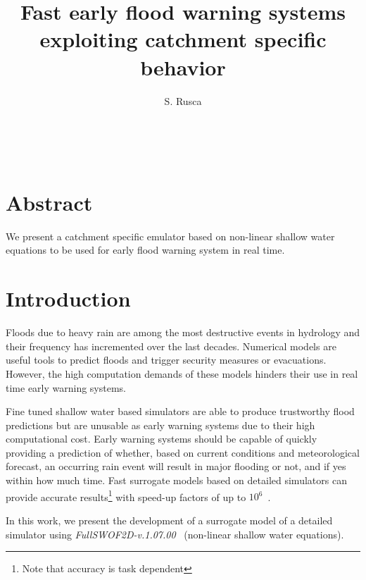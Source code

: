 \documentclass[12pt,a4paper,english,twocolumn,fleqn]{narms}
\begin{document}
\title{Fast early flood warning systems exploiting catchment specific behavior}
\author{{S. Rusca} \\
{} \\\\
{}\\
{}
} \maketitle


\section*{Abstract}

We present a catchment specific emulator based on non-linear shallow water equations to be used
for early flood warning system in real time.

\section{Introduction}

Floods due to heavy rain are among the most destructive events in hydrology and their frequency has incremented over the last decades.
Numerical models are useful tools to predict floods and trigger security measures or evacuations. However, the high computation demands of these models hinders their use in real time early warning systems.

Fine tuned shallow water based simulators are able to produce trustworthy flood predictions but are unusable as early warning systems due to their high computational cost.
Early warning systems should be capable of quickly providing a prediction of whether, based on current conditions and meteorological forecast, an occurring rain event will result in major flooding or not, and if yes within how much time.
Fast surrogate models based on detailed simulators can provide accurate results\footnote{Note that accuracy is task dependent} with speed-up factors of up to $10^6$~\citep[see][for an application in geophysical hazards]{Bayarri2015}.

In this work, we present the development of a surrogate model of a detailed simulator using \textit{FullSWOF\textunderscore2D-v.1.07.00}~\citep{fullswof} (non-linear shallow water equations).
\end{document}
